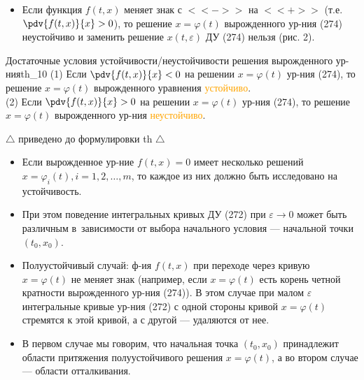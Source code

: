 \vspace{0.5cm}
\begin{itemize}
	\item Если функция $f(t,x)$ меняет знак с $<<->>$ на $<<+>>$ (т.е. $\pdv{f(t,x)}{x} > 0$), то решение $x=\varphi(t)$ вырожденного ур-ния (274) неустойчиво и заменить решение $x(t,\varepsilon)$ ДУ (274) нельзя (рис. 2).
\end{itemize}

\begin{theorem}{Достаточные условия устойчивости/неустойчивости решения вырожденного ур-ния}{th_10}
	(1) Если $\pdv{f(t,x)}{x} < 0$ на решении $x=\varphi(t)$ ур-ния (274), то решение $x=\varphi(t)$ вырожденного уравнения \textcolor{orange}{устойчиво}. \\
	(2) Если $\pdv{f(t,x)}{x} > 0$ на решении $x=\varphi(t)$ ур-ния (274), то решение $x=\varphi(t)$ вырожденного ур-ния \textcolor{orange}{неустойчиво}.
\end{theorem}

$\triangle$ приведено до формулировки th $\triangle$

\begin{itemize}
	\item Если вырожденное ур-ние $f(t,x)=0$ имеет несколько решений $x=\varphi_i(t), i=1,2,\dots,m$, то каждое из них должно быть исследовано на устойчивость.
	\item При этом поведение интегральных кривых ДУ (272) при $\varepsilon \to 0$ может быть различным в~зависимости от выбора начального условия --- начальной точки $(t_0, x_0)$.
	
	\item Полуустойчивый случай: ф-ия $f(t,x)$ при переходе через кривую $x=\varphi(t)$ не меняет знак (например, если $x=\varphi(t)$ есть корень четной кратности вырожденного ур-ния (274)). В этом случае при малом $\varepsilon$ интегральные кривые ур-ния (272) с одной стороны кривой $x=\varphi(t)$ стремятся к этой кривой, а с другой --- удаляются от нее.
	
	\item В первом случае мы говорим, что начальная точка $(t_0, x_0)$ принадлежит области притяжения полуустойчивого решения $x=\varphi(t)$, а во втором случае --- области отталкивания.
\end{itemize}

